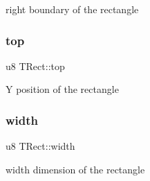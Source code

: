 right boundary of the rectangle \mbox{\label{group__TRect_ga145b5ca0d242dc39c33f1fa72dd04056}} 
\subsubsection{\texorpdfstring{top}{top}}
{\footnotesize\ttfamily u8 T\+Rect\+::top}

Y position of the rectangle \mbox{\label{group__TRect_ga1a0b1f4f8d316782395a16e4b88bc66f}} 
\subsubsection{\texorpdfstring{width}{width}}
{\footnotesize\ttfamily u8 T\+Rect\+::width}

width dimension of the rectangle 